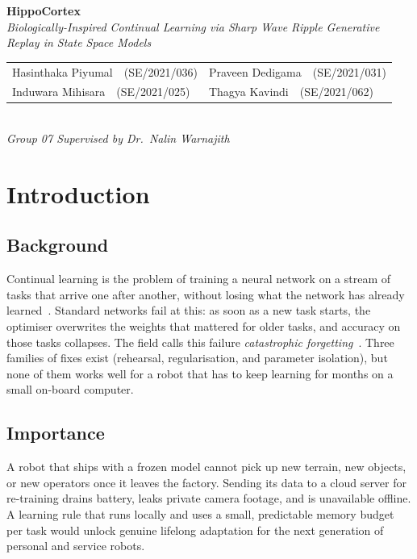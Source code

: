 \documentclass[11pt,a4paper]{article}
\renewcommand{\arraystretch}{1.0}
\begin{document}
\pagestyle{plain}

\begin{center}
{\sffamily\LARGE\bfseries HippoCortex}\\[0.2em]
{\itshape\small Biologically-Inspired Continual Learning via Sharp Wave Ripple Generative Replay in State Space Models}\\[0.7em]
{\footnotesize
\setlength{\tabcolsep}{4pt}\renewcommand{\arraystretch}{1.0}
\begin{tabular*}{0.82\linewidth}{@{\extracolsep{\fill}}ll@{}}
Hasinthaka Piyumal~~{\small(SE/2021/036)} & Praveen Dedigama~~{\small(SE/2021/031)} \\
Induwara Mihisara~~{\small(SE/2021/025)}  & Thagya Kavindi~~{\small(SE/2021/062)} \\
\end{tabular*}
}\\[0.45em]
{\itshape\footnotesize Group 07 \enspace\textbar\enspace Supervised by Dr.~Nalin Warnajith}
\end{center}

\section{Introduction}

\subsection{Background}
Continual learning is the problem of training a neural network on a stream of tasks that arrive one after another, without losing what the network has already learned~\citep{delange2022continual}. Standard networks fail at this: as soon as a new task starts, the optimiser overwrites the weights that mattered for older tasks, and accuracy on those tasks collapses. The field calls this failure \emph{catastrophic forgetting}~\citep{kirkpatrick2017overcoming}. Three families of fixes exist (rehearsal, regularisation, and parameter isolation), but none of them works well for a robot that has to keep learning for months on a small on-board computer.

\subsection{Importance}
A robot that ships with a frozen model cannot pick up new terrain, new objects, or new operators once it leaves the factory. Sending its data to a cloud server for re-training drains battery, leaks private camera footage, and is unavailable offline. A learning rule that runs locally and uses a small, predictable memory budget per task would unlock genuine lifelong adaptation for the next generation of personal and service robots.
\end{document}
